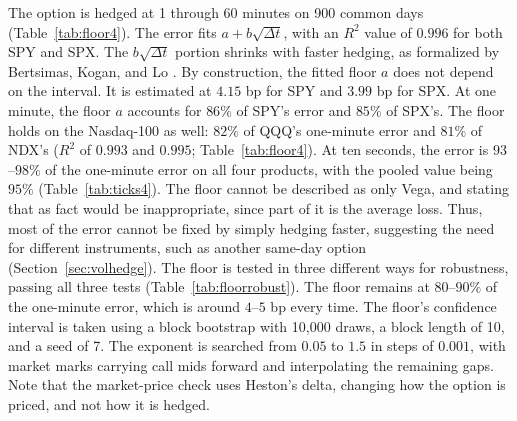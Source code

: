 \documentclass[11pt]{article}
\begin{document}
The option is hedged at 1 through 60 minutes on 900 common days (Table~\ref{tab:floor4}). The error fits $a + b\sqrt{\Delta t}$, with an $R^2$ value of $0.996$ for both SPY and SPX. The $b\sqrt{\Delta t}$ portion shrinks with faster hedging, as formalized by Bertsimas, Kogan, and Lo \cite{bertsimas2000}. By construction, the fitted floor $a$ does not depend on the interval. It is estimated at $4.15$ bp for SPY and $3.99$ bp for SPX. At one minute, the floor $a$ accounts for $86\%$ of SPY's error and $85\%$ of SPX's. The floor holds on the Nasdaq-100 as well: $82\%$ of QQQ's one-minute error and $81\%$ of NDX's ($R^2$ of $0.993$ and $0.995$; Table~\ref{tab:floor4}). At ten seconds, the error is $93$--$98\%$ of the one-minute error on all four products, with the pooled value being $95\%$ (Table~\ref{tab:ticks4}). The floor cannot be described as only Vega, and stating that as fact would be inappropriate, since part of it is the average loss. Thus, most of the error cannot be fixed by simply hedging faster, suggesting the need for different instruments, such as another same-day option (Section~\ref{sec:volhedge}).
The floor is tested in three different ways for robustness, passing all three tests (Table~\ref{tab:floorrobust}). The floor remains at $80$--$90\%$ of the one-minute error, which is around $4$--$5$ bp every time. The floor's confidence interval is taken using a block bootstrap with 10{,}000 draws, a block length of 10, and a seed of 7. The exponent is searched from $0.05$ to $1.5$ in steps of $0.001$, with market marks carrying call mids forward and interpolating the remaining gaps.
Note that the market-price check uses Heston's delta, changing how the option is priced, and not how it is hedged.
\end{document}
